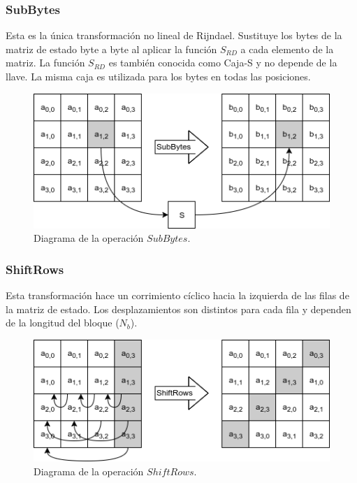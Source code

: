 \subsubsection{SubBytes}
Esta es la única transformación no lineal de Rijndael. Sustituye
los bytes de la matriz de estado byte a byte al aplicar la función
$S_{RD}$ a cada elemento de la matriz. La función $S_{RD}$ es también
conocida como Caja-S y no depende de la llave. La misma caja es utilizada
para los bytes en todas las posiciones.

\begin{figure}[H]
  \begin{center}
    \includegraphics[width=0.6\linewidth]
      {contenidos/antecedentes/bloques/diagramas/subBytes}
     \caption{Diagrama de la operación $SubBytes$.}
   \end{center}
\end{figure}

\subsubsection{ShiftRows}
Esta transformación hace un corrimiento cíclico hacia la izquierda de las
filas de la matriz de estado. Los desplazamientos son distintos para cada
fila y dependen de la longitud del bloque ($N_b$).

\begin{figure}[H]
  \begin{center}
    \includegraphics[width=0.6\linewidth]
      {contenidos/antecedentes/bloques/diagramas/shiftRows}
     \caption{Diagrama de la operación $ShiftRows$.}
   \end{center}
\end{figure}

